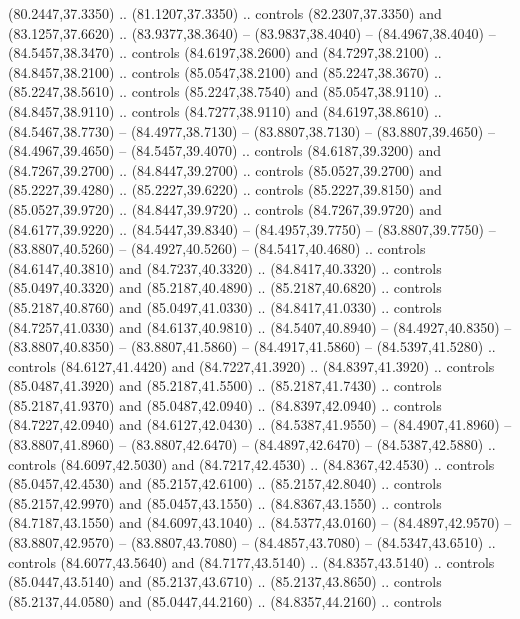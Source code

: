 \begin{scope}[cm={{1.25,0.0,0.0,-1.25,(-71.74049,81.13304)}}]
        (80.2447,37.3350) .. (81.1207,37.3350) .. controls (82.2307,37.3350) and
        (83.1257,37.6620) .. (83.9377,38.3640) -- (83.9837,38.4040) --
        (84.4967,38.4040) -- (84.5457,38.3470) .. controls (84.6197,38.2600) and
        (84.7297,38.2100) .. (84.8457,38.2100) .. controls (85.0547,38.2100) and
        (85.2247,38.3670) .. (85.2247,38.5610) .. controls (85.2247,38.7540) and
        (85.0547,38.9110) .. (84.8457,38.9110) .. controls (84.7277,38.9110) and
        (84.6197,38.8610) .. (84.5467,38.7730) -- (84.4977,38.7130) --
        (83.8807,38.7130) -- (83.8807,39.4650) -- (84.4967,39.4650) --
        (84.5457,39.4070) .. controls (84.6187,39.3200) and (84.7267,39.2700) ..
        (84.8447,39.2700) .. controls (85.0527,39.2700) and (85.2227,39.4280) ..
        (85.2227,39.6220) .. controls (85.2227,39.8150) and (85.0527,39.9720) ..
        (84.8447,39.9720) .. controls (84.7267,39.9720) and (84.6177,39.9220) ..
        (84.5447,39.8340) -- (84.4957,39.7750) -- (83.8807,39.7750) --
        (83.8807,40.5260) -- (84.4927,40.5260) -- (84.5417,40.4680) .. controls
        (84.6147,40.3810) and (84.7237,40.3320) .. (84.8417,40.3320) .. controls
        (85.0497,40.3320) and (85.2187,40.4890) .. (85.2187,40.6820) .. controls
        (85.2187,40.8760) and (85.0497,41.0330) .. (84.8417,41.0330) .. controls
        (84.7257,41.0330) and (84.6137,40.9810) .. (84.5407,40.8940) --
        (84.4927,40.8350) -- (83.8807,40.8350) -- (83.8807,41.5860) --
        (84.4917,41.5860) -- (84.5397,41.5280) .. controls (84.6127,41.4420) and
        (84.7227,41.3920) .. (84.8397,41.3920) .. controls (85.0487,41.3920) and
        (85.2187,41.5500) .. (85.2187,41.7430) .. controls (85.2187,41.9370) and
        (85.0487,42.0940) .. (84.8397,42.0940) .. controls (84.7227,42.0940) and
        (84.6127,42.0430) .. (84.5387,41.9550) -- (84.4907,41.8960) --
        (83.8807,41.8960) -- (83.8807,42.6470) -- (84.4897,42.6470) --
        (84.5387,42.5880) .. controls (84.6097,42.5030) and (84.7217,42.4530) ..
        (84.8367,42.4530) .. controls (85.0457,42.4530) and (85.2157,42.6100) ..
        (85.2157,42.8040) .. controls (85.2157,42.9970) and (85.0457,43.1550) ..
        (84.8367,43.1550) .. controls (84.7187,43.1550) and (84.6097,43.1040) ..
        (84.5377,43.0160) -- (84.4897,42.9570) -- (83.8807,42.9570) --
        (83.8807,43.7080) -- (84.4857,43.7080) -- (84.5347,43.6510) .. controls
        (84.6077,43.5640) and (84.7177,43.5140) .. (84.8357,43.5140) .. controls
        (85.0447,43.5140) and (85.2137,43.6710) .. (85.2137,43.8650) .. controls
        (85.2137,44.0580) and (85.0447,44.2160) .. (84.8357,44.2160) .. controls

\end{scope}

